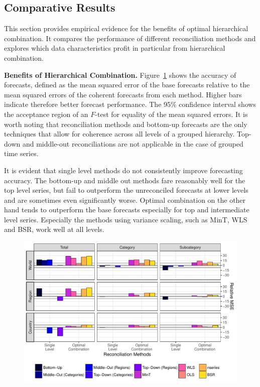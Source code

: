\documentclass[a4paper,fleqn,11pt]{article}
\begin{document}
\subsection{Comparative Results}

This section provides empirical evidence for the benefits of optimal hierarchical combination. It compares the performance of different reconciliation methods and explores which data characteristics profit in particular from hierarchical combination.

\noindent\textbf{Benefits of Hierarchical Combination.} Figure~\ref{fig:rmse} shows the accuracy of forecasts, defined as the mean squared error of the base forecasts relative to the mean squared errors of the coherent forecasts from each method. Higher bars indicate therefore better forecast performance. The 95\% confidence interval shows the acceptance region of an $F$-test for equality of the mean squared errors. It is worth noting that reconciliation methods and bottom-up forecasts are the only techniques that allow for coherence across all levels of a grouped hierarchy. Top-down and middle-out reconciliations are not applicable in the case of grouped time series.

It is evident that single level methods do not consistently improve forecasting accuracy. The bottom-up and middle out methods fare reasonably well for the top level series, but fail to outperform the unreconciled forecasts at lower levels and are sometimes even significantly worse. Optimal combination on the other hand tends to outperform the base forecasts especially for top and intermediate level series. Especially the methods using variance scaling, such as MinT, WLS and BSR, work well at all levels.

\begin{figure}[H]
	\includegraphics[width=\textwidth]{fig/fig_eval_rmse_relative}
	\label{fig:rmse}
\end{figure}
\end{document}

